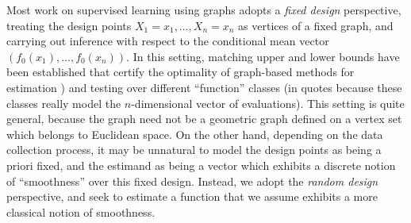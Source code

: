\documentclass{article}
\theoremstyle{definition}
\newcommand{\1}{\mathbf{1}}
\begin{document}
	Most work on supervised learning using graphs adopts a \emph{fixed design} perspective, treating the design points $X_1 = x_1,\ldots,X_n = x_n$ as vertices of a fixed graph, and carrying out inference with respect to the conditional mean vector $(f_0(x_1),\ldots,f_0(x_n))$. In this setting, matching upper and lower bounds have been established that certify the optimality of graph-based methods for estimation \citep{wang2016,hutter2016,sadhanala16,sadhanala17,kirichenko2017,kirichenko2018}) and testing \citep{sharpnack2010identifying,sharpnack2013b,sharpnack2013,sharpnack2015} over different ``function'' classes (in quotes because these classes really model the $n$-dimensional vector of evaluations). This setting is quite general, because the graph need not be a geometric graph defined on a vertex set which belongs to Euclidean space. On the other hand, depending on the data collection process, it may be unnatural to model the design points as being a priori fixed, and the estimand as being a vector which exhibits a discrete notion of ``smoothness'' over this fixed design. Instead, we adopt the \emph{random design} perspective, and seek to estimate a function that we assume exhibits a more classical notion of smoothness. 
	
	

 
	
\end{document}
